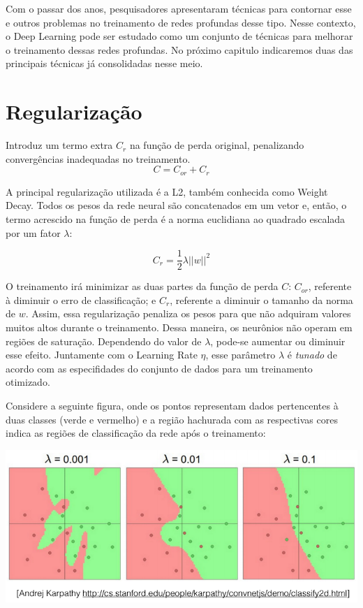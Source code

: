 \documentclass[
	12pt,				%
	oneside,			%
	a4paper,			%
	english,			%
	french,				%
	spanish,			%
	brazil,				%
	]{abntex2}
\begin{document}
Com o passar dos anos, pesquisadores apresentaram técnicas para contornar esse e outros problemas no treinamento de redes profundas desse tipo. Nesse contexto, o Deep Learning pode ser estudado como um conjunto de técnicas para melhorar o treinamento dessas redes profundas. No próximo capitulo indicaremos duas das principais técnicas já consolidadas nesse meio.

\section{Regularização}
Introduz um termo extra $C_r$ na função de perda original, penalizando convergências inadequadas no treinamento.
$$ C = C_{or} + C_r$$

A principal regularização utilizada é a L2, também conhecida como Weight Decay. Todos os pesos da rede neural são concatenados em um vetor e, então, o termo acrescido na função de perda é a norma euclidiana ao quadrado escalada por um fator $\lambda$:

$$ C_r = \frac{1}{2} \lambda || w ||^2 $$

O treinamento irá minimizar as duas partes da função de perda $C$: $C_{or}$, referente à diminuir o erro de classificação; e $C_r$, referente a diminuir o tamanho da norma de $w$. Assim, essa regularização penaliza os pesos para que não adquiram valores muitos altos durante o treinamento. Dessa maneira, os neurônios não operam em regiões de saturação. Dependendo do valor de $\lambda$, pode-se aumentar ou diminuir esse efeito. Juntamente com o Learning Rate $\eta$, esse parâmetro $\lambda$ é \textit{tunado} de acordo com as especifidades do conjunto de dados para um treinamento otimizado.

Considere a seguinte figura, onde os pontos representam dados pertencentes à duas classes (verde e vermelho) e a região hachurada com as respectivas cores indica as regiões de classificação da rede após o treinamento:

\begin{center}
	\includegraphics[scale=0.8]{regL2.png}
\end{center}
\end{document}
